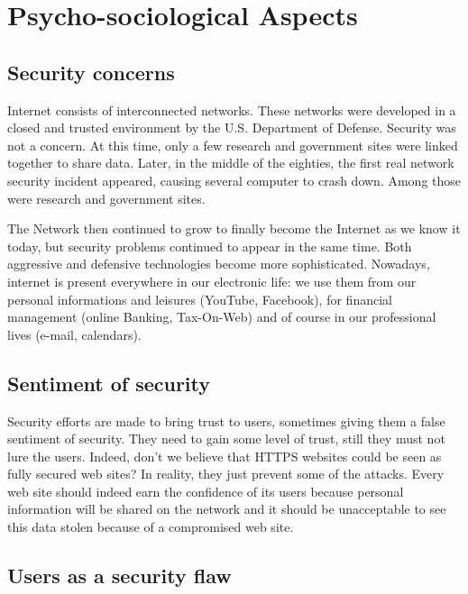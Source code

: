 
\section{Psycho-sociological Aspects}

\subsection{Security concerns}

Internet consists of interconnected networks. These networks were developed in
a closed and trusted environment by the U.S. Department of Defense.
Security was not a concern. At this time, only a few research and government
sites were linked together to share data. Later, in the middle of the
eighties, the first real network security incident appeared, causing several
computer to crash down. Among those were research and government sites.

The Network then continued to grow to finally become the Internet as we know
it today, but security problems continued to appear in the same time. Both
aggressive and defensive technologies become more sophisticated.
Nowadays, internet is present everywhere in our electronic life: we use them
from our personal informations and leisures (YouTube, Facebook), for financial
management (online Banking, Tax-On-Web) and of course in our professional
lives (e-mail, calendars).

\subsection{Sentiment of security}

Security efforts are made to bring trust to users, sometimes giving them a
false sentiment of security. They need to gain some level of trust, still they
must not lure the users. Indeed, don't we believe that HTTPS websites could be
seen as fully secured web sites? In reality, they just prevent some of the
attacks.
Every web site should indeed earn the confidence of its users because
personal information will be shared on the network and it should be
unacceptable to see this data stolen because of a compromised web site.

\subsection{Users as a security flaw}


